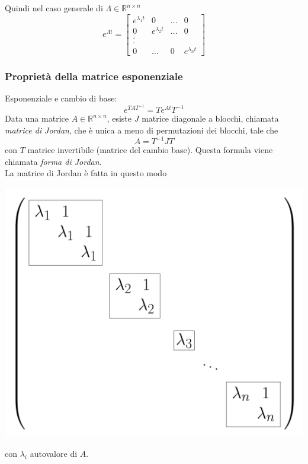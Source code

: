 \documentclass{article}
\begin{document}
Quindi nel caso generale di $\Lambda \in \mathbb{R}^{n \times n}$
\[
    e^{\Lambda t} = 
    \begin{bmatrix}
        e^{\lambda_1 t} & 0 & ... & 0\\
        0 & e^{\lambda_2 t} & ... & 0\\
        .\\
        .\\
        0 & ... & 0 & e^{\lambda_n t}
    \end{bmatrix}
\]


\subsubsection{Proprietà della matrice esponenziale}
Esponenziale e cambio di base:
\[
    e^{TAT^{-1}} = Te^{At}T^{-1}
\]
Data una matrice $A \in \mathbb{R}^{n \times n}$, esiste $J$ matrice diagonale a blocchi, chiamata \textit{matrice di Jordan}, che è unica a meno di permutazioni dei blocchi, tale che
\[
    A = T^{-1} J T
\]
con $T$ matrice invertibile (matrice del cambio base). Questa formula viene chiamata \textit{forma di Jordan}.
\vspace*{0.2cm}\\
La matrice di Jordan è fatta in questo modo
\begin{center}
    \includegraphics[scale=0.13]{Images/Jordan_matrix.png}
\end{center}
con $\lambda_i$ autovalore di $A$.
\vspace*{0.2cm}\\
\end{document}
